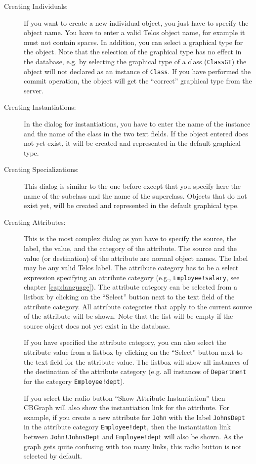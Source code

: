 \begin{description}
\item[Creating Individuals:] If you want to create a new individual object,
  you just have to specify the object name. You have to enter a valid
  Telos object name, for example it must not contain spaces. In addition, you can select a
  graphical type for the object. Note that the selection of the graphical type
  has no effect in the database, e.g. by selecting the graphical type of a class ({\tt ClassGT})
  the object will not declared as an instance of {\tt Class}. If you have performed
  the commit operation, the object will get the ``correct'' graphical type from the server.

\item[Creating Instantiations:] In the dialog for instantiations, you have to
enter the name of the instance and the name of the class in the two text fields.
If the object entered does not yet exist, it will be created and represented in the default
graphical type.

\item[Creating Specializations:] This dialog is similar to the one before except that
you specify here the name of the subclass and the name of the superclass. Objects that
do not exist yet, will be created and represented in the default graphical type.

\item[Creating Attributes:] This is the most complex dialog as you have to specify
the source, the label, the value, and the category of the attribute.
The source and the value (or destination) of the attribute are normal object names.
The label may be any valid Telos label. The attribute category has to be a select expression
specifying an attribute category (e.g., {\tt Employee!salary}, see chapter \ref{cap:language}).
The attribute category can be selected from a listbox by clicking on the ``Select'' button
next to the text field of the attribute category. All attribute categories that apply to
the current source of the attribute will be shown. Note that the list will be empty
if the source object does not yet exist in the database.

If you have specified the attribute category, you can also select the attribute value
from a listbox by clicking on the ``Select'' button next to the text field for the attribute
value. The listbox will show all instances of the destination of the attribute category
(e.g. all instances of {\tt Department} for the category {\tt Employee!dept}).

If you select the radio button ``Show Attribute Instantiation'' then CBGraph
will also show the instantiation link for the attribute. For example, if you create
a new attribute for {\tt John} with the label {\tt JohnsDept} in the attribute category
{\tt Employee!dept}, then the instantiation link between {\tt John!JohnsDept} and
{\tt Employee!dept} will also be shown. As the graph gets quite confusing with too
many links, this radio button is not selected by default.
\end{description}

